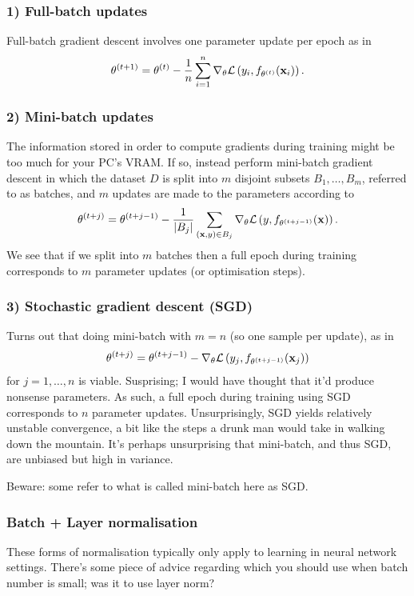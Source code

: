 \documentclass[11pt]{article}
\begin{document}
\subsubsection*{1) Full-batch updates}
Full-batch gradient descent involves one parameter update per epoch as in
$$
\theta^{(t+1)}
=
\theta^{(t)}-\frac{1}{n}\sum_{i=1}^n \nabla_{\theta}\mathcal{L}\left(y_i,f_{\theta^{(t)}}(\mathbf{x}_i)\right).
$$

\subsubsection*{2) Mini-batch updates}
The information stored in order to compute gradients during training might be too much for your PC's VRAM. If so, instead perform mini-batch gradient descent in which the dataset $D$ is split into $m$ disjoint subsets $B_1,\dots,B_m$, referred to as batches, and $m$ updates are made to the parameters according to
$$
\theta^{(t+j)}
=
\theta^{(t+j-1)}-\frac{1}{|B_j|}\sum_{(\mathbf{x},y)\in B_j} \nabla_{\theta}\mathcal{L}\left(y,f_{\theta^{(t+j-1)}}(\mathbf{x})\right).
$$
We see that if we split into $m$ batches then a full epoch during training corresponds to $m$ parameter updates (or optimisation steps).

\subsubsection*{3) Stochastic gradient descent (SGD)}
Turns out that doing mini-batch with $m=n$ (so one sample per update), as in
$$
\theta^{(t+j)}
=
\theta^{(t+j-1)}-\nabla_{\theta}\mathcal{L}\left(y_j,f_{\theta^{(t+j-1)}}(\mathbf{x}_j)\right)
$$
for $j=1,\dots,n$ is viable. Susprising; I would have thought that it'd produce nonsense parameters. As such, a full epoch during training using SGD corresponds to $n$ parameter updates. Unsurprisingly, SGD yields relatively unstable convergence, a bit like the steps a drunk man would take in walking down the mountain. It's perhaps unsurprising that mini-batch, and thus SGD, are unbiased but high in variance.

\begin{tcolorbox}[title={\centering\textbf{Confusing use of terminology}}, colback=myLightBlue, colbacktitle=myDarkBlue, colframe=myDarkBlue, coltitle=white]
    Beware: some refer to what is called mini-batch here as SGD.
\end{tcolorbox}

\subsubsection{Batch + Layer normalisation}
These forms of normalisation typically only apply to learning in neural network settings. There's some piece of advice regarding which you should use when batch number is small; was it to use layer norm?
\end{document}
